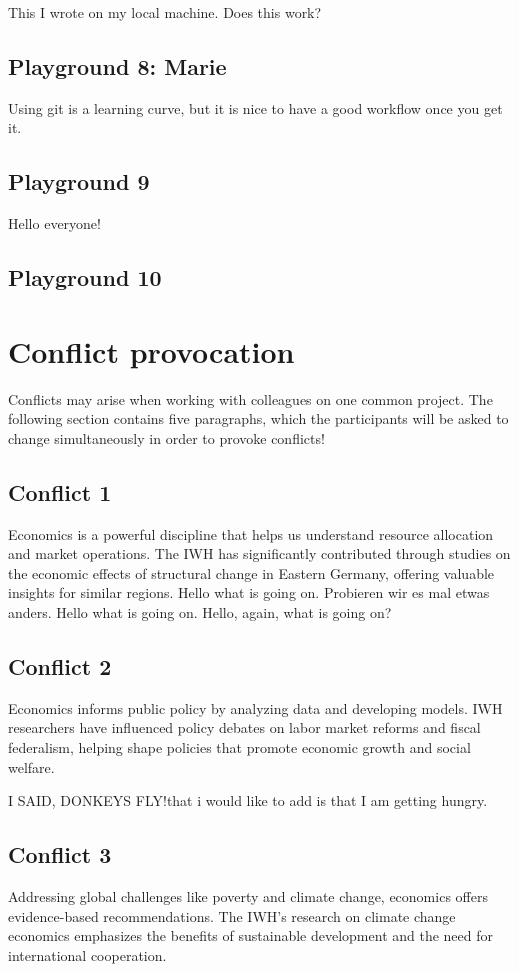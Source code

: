 \documentclass{article}
\begin{document}
This I wrote on my local machine. Does this work?


\subsection{Playground 8: Marie}

Using git is a learning curve, but it is nice to have a good workflow once you get it. 

\subsection{Playground 9}
Hello everyone!
\subsection{Playground 10}




\section{Conflict provocation}
Conflicts may arise when working with colleagues on one common project. The following section contains five paragraphs, which the participants will be asked to change simultaneously in order to provoke conflicts!

\subsection{Conflict 1}
Economics is a powerful discipline that helps us understand resource allocation and market operations. The IWH has significantly contributed through studies on the economic effects of structural change in Eastern Germany, offering valuable insights for similar regions.
Hello what is going on. Probieren wir es mal etwas anders.
Hello what is going on. Hello, again, what is going on?

\subsection{Conflict 2}
Economics informs public policy by analyzing data and developing models. IWH researchers have influenced policy debates on labor market reforms and fiscal federalism, helping shape policies that promote economic growth and social welfare.

I SAID, DONKEYS FLY!that i would like to add is that I am getting hungry. 

\subsection{Conflict 3}
Addressing global challenges like poverty and climate change, economics offers evidence-based recommendations. The IWH's research on climate change economics emphasizes the benefits of sustainable development and the need for international cooperation.
\end{document}
